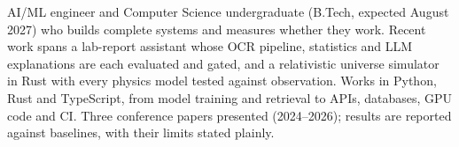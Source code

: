 
AI/ML engineer and Computer Science undergraduate (B.Tech, expected August 2027) who builds complete systems and measures whether they work. Recent work spans a lab-report assistant whose OCR pipeline, statistics and LLM explanations are each evaluated and gated, and a relativistic universe simulator in Rust with every physics model tested against observation. Works in Python, Rust and TypeScript, from model training and retrieval to APIs, databases, GPU code and CI. Three conference papers presented (2024--2026); results are reported against baselines, with their limits stated plainly.

\vspace{4pt}

